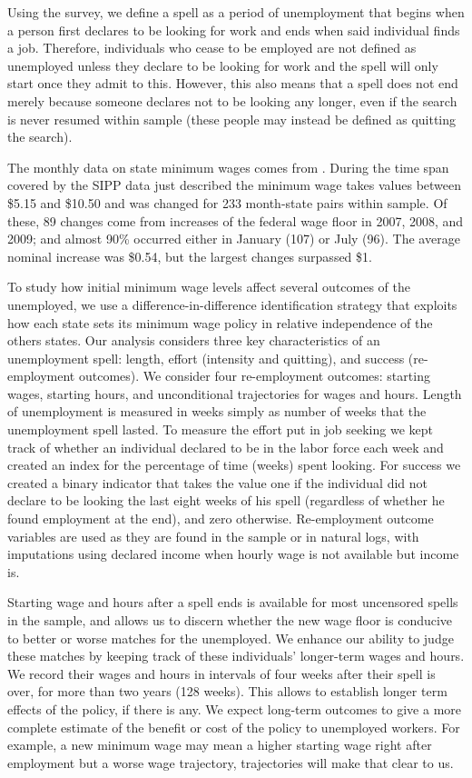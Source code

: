 \documentclass{article}
\begin{document}
Using the survey, we define a spell as a period of unemployment that begins when a person first declares to be looking for work and ends when said individual finds a job. Therefore, individuals who cease to be employed are not defined as unemployed unless they declare to be looking for work and the spell will only start once they admit to this. However, this also means that a spell does not end merely because someone declares not to be looking any longer, even if the search is never resumed within sample (these people may instead be defined as quitting the search).

The monthly data on state minimum wages comes from \cite{vaghul2016historical}. During the time span covered by the SIPP data just described the minimum wage takes values between \$5.15 and \$10.50 and was changed for 233 month-state pairs within sample. Of these, 89 changes come from increases of the federal wage floor in 2007, 2008, and 2009; and almost 90\% occurred either in January (107) or July (96). The average nominal increase was \$0.54, but the largest changes surpassed \$1. 

To study how initial minimum wage levels affect several outcomes of the unemployed, we use a difference-in-difference identification strategy that exploits how each state sets its minimum wage policy in relative independence of the others states. Our analysis considers three key characteristics of an unemployment spell: length, effort (intensity and quitting), and success (re-employment outcomes). We consider four re-employment outcomes: starting wages, starting hours, and unconditional trajectories for wages and hours. Length of unemployment is measured in weeks simply as number of weeks that the unemployment spell lasted. To measure the effort put in job seeking we kept track of whether an individual declared to be in the labor force each week and created an index for the percentage of time (weeks) spent looking. For success we created a binary indicator that takes the value one if the individual did not declare to be looking the last eight weeks of his spell (regardless of whether he found employment at the end), and zero otherwise. Re-employment outcome variables are used as they are found in the sample or in natural logs, with imputations using declared income when hourly wage is not available but income is.

Starting wage and hours after a spell ends is available for most uncensored spells in the sample, and allows us to discern whether the new wage floor is conducive to better or worse matches for the unemployed. We enhance our ability to judge these matches by keeping track of these individuals' longer-term wages and hours. We record their wages and hours in intervals of four weeks after their spell is over, for more than two years (128 weeks). This allows to establish longer term effects of the policy, if there is any. We expect long-term outcomes to give a more complete estimate of the benefit or cost of the policy to unemployed workers. For example, a new minimum wage may mean a higher starting wage right after employment but a worse wage trajectory, trajectories will make that clear to us.
\end{document}
